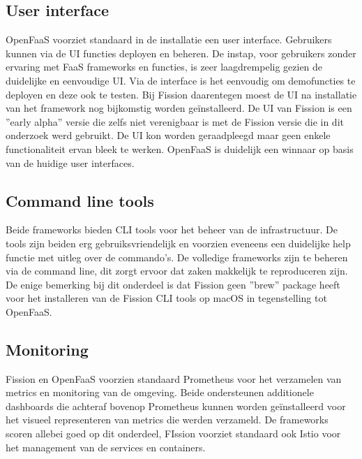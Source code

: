 \subsection{User interface}
OpenFaaS voorziet standaard in de installatie een user interface. Gebruikers kunnen via de UI functies deployen en beheren. De instap, voor gebruikers zonder ervaring met FaaS frameworks en functies, is zeer laagdrempelig gezien de duidelijke en eenvoudige UI. Via de interface is het eenvoudig om demofuncties te deployen en deze ook te testen. Bij Fission daarentegen moest de UI na installatie van het framework nog bijkomstig worden geïnstalleerd. De UI van Fission is een ''early alpha'' versie die zelfs niet verenigbaar is met de Fission versie die in dit onderzoek werd gebruikt. De UI kon worden geraadpleegd maar geen enkele functionaliteit ervan bleek te werken. OpenFaaS is duidelijk een winnaar op basis van de huidige user interfaces.

\subsection{Command line tools}
Beide frameworks bieden CLI tools voor het beheer van de infrastructuur. De tools zijn beiden erg gebruiksvriendelijk en voorzien eveneens een duidelijke help functie met uitleg over de commando's. De volledige frameworks zijn te beheren via de command line, dit zorgt ervoor dat zaken makkelijk te reproduceren zijn. De enige bemerking bij dit onderdeel is dat Fission geen ''brew'' package heeft voor het installeren van de Fission CLI tools op macOS in tegenstelling tot OpenFaaS.

\subsection{Monitoring}
Fission en OpenFaaS voorzien standaard Prometheus voor het verzamelen van metrics en monitoring van de omgeving. Beide ondersteunen additionele dashboards die achteraf bovenop Prometheus kunnen worden geïnstalleerd voor het visueel representeren van metrics die werden verzameld. De frameworks scoren allebei goed op dit onderdeel, FIssion voorziet standaard ook Istio voor het management van de services en containers.

